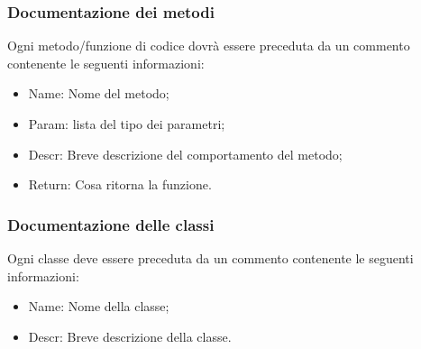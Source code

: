 \subsubsection{Documentazione dei metodi}
\label{5.3.2}
Ogni metodo/funzione di codice dovrà essere preceduta da un commento contenente le seguenti informazioni:
\begin{itemize}
\item Name: Nome del metodo;
\item Param: lista del tipo dei parametri;
\item Descr: Breve descrizione del comportamento del metodo;
\item Return: Cosa ritorna la funzione.
\end{itemize}

\subsubsection{Documentazione delle classi}
\label{5.3.3}
Ogni classe deve essere preceduta da un commento contenente le seguenti informazioni:
\begin{itemize}
\item Name: Nome della classe;
\item Descr: Breve descrizione della classe.
\end{itemize}

